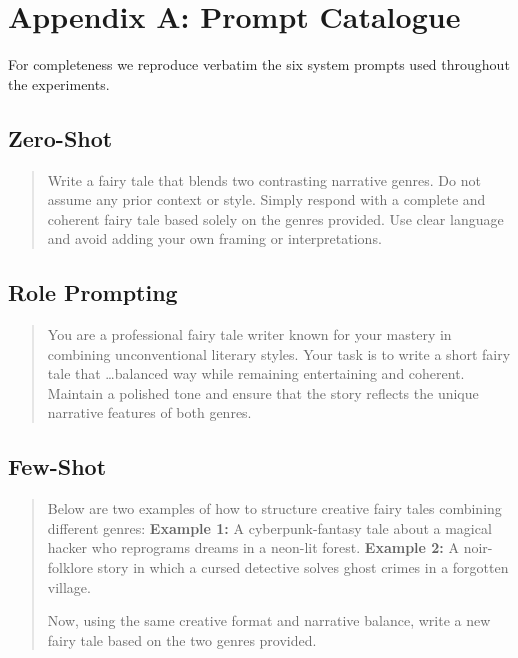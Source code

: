 \documentclass[12pt]{article}
\begin{document}
\newpage
\appendix

\appendix
\section{Appendix A: Prompt Catalogue}


For completeness we reproduce verbatim the six system prompts used
throughout the experiments.

\subsection*{Zero-Shot}\label{app:prompt_zero}
\begin{quote}\small
Write a fairy tale that blends two contrasting narrative genres.
Do not assume any prior context or style. Simply respond with a
complete and coherent fairy tale based solely on the genres provided.
Use clear language and avoid adding your own framing or interpretations.
\end{quote}

\subsection*{Role Prompting}\label{app:prompt_role}
\begin{quote}\small
You are a professional fairy tale writer known for your mastery in
combining unconventional literary styles. Your task is to write a
short fairy tale that \dots balanced way while remaining entertaining
and coherent. Maintain a polished tone and ensure that the story
reflects the unique narrative features of both genres.
\end{quote}

\subsection*{Few-Shot}\label{app:prompt_few}
\begin{quote}\small
Below are two examples of how to structure creative fairy tales
combining different genres:  
\textbf{Example 1:} A cyberpunk-fantasy tale about a magical hacker who
reprograms dreams in a neon-lit forest.  
\textbf{Example 2:} A noir-folklore story in which a cursed detective
solves ghost crimes in a forgotten village.  

Now, using the same creative format and narrative balance, write a new
fairy tale based on the two genres provided.
\end{quote}
\end{document}
